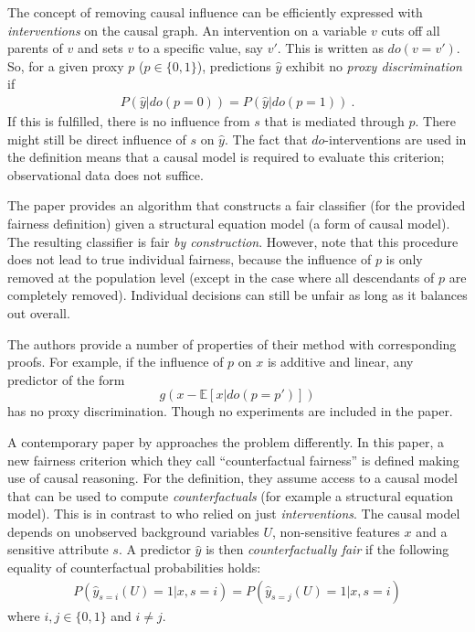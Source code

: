 The concept of removing causal influence
can be efficiently expressed with \emph{interventions} on the causal graph.
An intervention on a variable \(v\) cuts off all parents of \(v\)
and sets \(v\) to a specific value, say \(v'\).
This is written as \(do(v=v')\).
So, for a given proxy \(p\) (\(p \in \{0, 1\}\)),
predictions \(\hat{y}\) exhibit no \emph{proxy discrimination} if
\begin{align}
  \label{eq:proxy-discrimination}
  P(\hat{y}|do(p=0)) = P(\hat{y}|do(p=1))~.
\end{align}
If this is fulfilled, there is no influence from \(s\) that is mediated through \(p\).
There might still be direct influence of \(s\) on \(\hat{y}\).
The fact that \(do\)-interventions are used in the definition means
that a causal model is required to evaluate this criterion; observational data does not suffice.

The paper provides an algorithm that constructs a fair classifier (for the provided fairness definition)
given a structural equation model (a form of causal model).
The resulting classifier is fair \emph{by construction}.
However, note that this procedure does not lead to true individual fairness,
because the influence of \(p\) is only removed at the population level
(except in the case where all descendants of \(p\) are completely removed).
Individual decisions can still be unfair as long as it balances out overall.

The authors provide a number of properties of their method with corresponding proofs.
For example, if the influence of \(p\) on \(x\) is additive and linear,
any predictor of the form \[g(x - \mathbb{E}[x|do(p=p')])\] has no proxy discrimination.
Though no experiments are included in the paper.


A contemporary paper by \citet{kusner2017counterfactual} approaches the problem differently.
In this paper, a new fairness criterion which they call ``counterfactual fairness''
is defined making use of causal reasoning.
For the definition, they assume access to a causal model
that can be used to compute \emph{counterfactuals} (for example a structural equation model).
This is in contrast to \citet{kilbertus2017avoiding} who relied on just \emph{interventions}.
The causal model depends on unobserved background variables \(U\),
non-sensitive features \(x\) and a sensitive attribute \(s\).
A predictor \(\hat{y}\) is then \emph{counterfactually fair}
if the following equality of counterfactual probabilities holds:
\begin{align}
  \label{eq:counterfactual-fairness}
  P(\hat{y}_{s=i}(U) = 1|x, s=i)=P(\hat{y}_{s=j}(U) = 1|x, s=i)
\end{align}
where \(i, j \in \{0, 1\}\) and \(i \neq j\).

